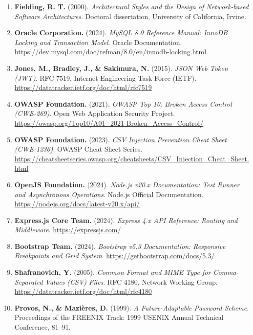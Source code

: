 \documentclass[11pt,a4paper]{report}
\begin{document}
\begin{enumerate}[leftmargin=1.5em, itemsep=0.6em]
    \item \textbf{Fielding, R. T.} (2000). \textit{Architectural Styles and the Design of Network-based Software Architectures}. Doctoral dissertation, University of California, Irvine.
    \item \textbf{Oracle Corporation.} (2024). \textit{MySQL 8.0 Reference Manual: InnoDB Locking and Transaction Model}. Oracle Documentation. \url{https://dev.mysql.com/doc/refman/8.0/en/innodb-locking.html}
    \item \textbf{Jones, M., Bradley, J., \& Sakimura, N.} (2015). \textit{JSON Web Token (JWT)}. RFC 7519, Internet Engineering Task Force (IETF). \url{https://datatracker.ietf.org/doc/html/rfc7519}
    \item \textbf{OWASP Foundation.} (2021). \textit{OWASP Top 10: Broken Access Control (CWE-269)}. Open Web Application Security Project. \url{https://owasp.org/Top10/A01_2021-Broken_Access_Control/}
    \item \textbf{OWASP Foundation.} (2023). \textit{CSV Injection Prevention Cheat Sheet (CWE-1236)}. OWASP Cheat Sheet Series. \url{https://cheatsheetseries.owasp.org/cheatsheets/CSV_Injection_Cheat_Sheet.html}
    \item \textbf{OpenJS Foundation.} (2024). \textit{Node.js v20.x Documentation: Test Runner and Asynchronous Operations}. Node.js Official Documentation. \url{https://nodejs.org/docs/latest-v20.x/api/}
    \item \textbf{Express.js Core Team.} (2024). \textit{Express 4.x API Reference: Routing and Middleware}. \url{https://expressjs.com/}
    \item \textbf{Bootstrap Team.} (2024). \textit{Bootstrap v5.3 Documentation: Responsive Breakpoints and Grid System}. \url{https://getbootstrap.com/docs/5.3/}
    \item \textbf{Shafranovich, Y.} (2005). \textit{Common Format and MIME Type for Comma-Separated Values (CSV) Files}. RFC 4180, Network Working Group. \url{https://datatracker.ietf.org/doc/html/rfc4180}
    \item \textbf{Provos, N., \& Mazières, D.} (1999). \textit{A Future-Adaptable Password Scheme}. Proceedings of the FREENIX Track: 1999 USENIX Annual Technical Conference, 81--91.
\end{enumerate}
\end{document}
